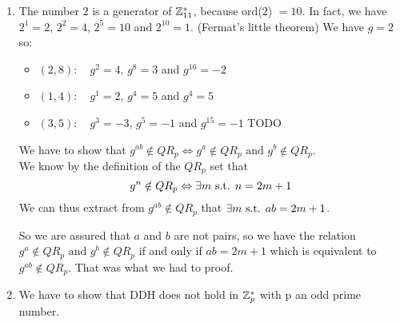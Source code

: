 \begin{solution}
\begin{enumerate}
	\item
		The number $2$ is a generator of $\mathbb{Z}_{11}^*$, because ord($2$) $= 10$. In fact, we have $2^1 = 2$, $2^2 = 4$, $2^5 = 10$ and $2^10 = 1$. (Fermat's little theorem)
		We have $g = 2$ so:
		\begin{itemize}
			\item $(2,8):\quad g^2 = 4$, $g^8 = 3$ and $g^{16} = -2$ 
			\item $(1,4):\quad g^1 = 2$, $g^4 = 5$ and $g^{4} = 5$
			\item $(3,5):\quad g^3 = -3$, $g^5 = -1$ and $g^{15} = -1$ TODO
		\end{itemize}
		We have to show that $g^{ab} \notin QR_p \Leftrightarrow g^a \notin QR_p \text{ and } g^b \notin QR_p$.\\
		We know by the definition of the $QR_p$ set that
		$$g^n \notin QR_p \Leftrightarrow \exists m \text{ s.t. } n = 2m+1$$
		We can thus extract from $g^{ab} \notin QR_p$ that $\exists m \text{ s.t. } ab = 2m+1$.
	    
		
		So we are assured that $a$ and $b$ are not pairs, so we have the relation $g^a \notin QR_p \text{ and } g^b \notin QR_p$ if and only if $ab = 2m+1$ which is equivalent to $g^{ab} \notin QR_p$. That was what we had to proof.
		
	\item
		We have to show that DDH does not hold in $\mathbb{Z}_p^*$ with p an odd prime number.
		

\end{enumerate}
\end{solution}
